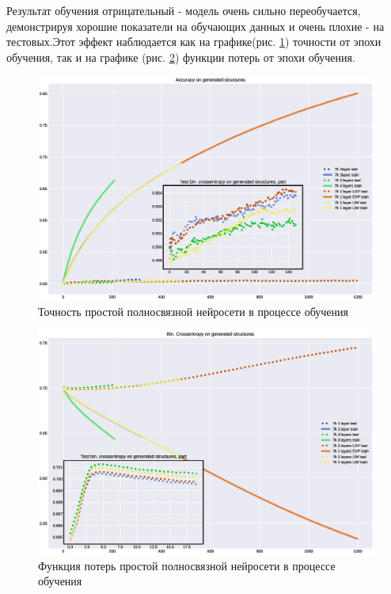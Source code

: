 \documentclass{article}
\begin{document}
Результат обучения отрицательный - модель очень сильно переобучается, демонстрируя хорошие показатели на обучающих данных и очень плохие - на тестовых.Этот эффект наблюдается как на графике(рис. \ref{fig:acc_7k}) точности от эпохи обучения, так и на графике (рис. \ref{fig:loss_7k}) функции потерь от эпохи обучения.

\begin{figure}[!htp]
\includegraphics[width=\linewidth]{imgs/acc-7k.eps}
  \caption{Точность простой полносвязной нейросети в процессе обучения}\label{fig:acc_7k}
\end{figure}

\begin{figure}[!htp]
\includegraphics[width=\linewidth]{imgs/loss-7k.eps}
  \caption{Функция потерь простой полносвязной нейросети в процессе обучения}\label{fig:loss_7k}
\end{figure}
\end{document}
